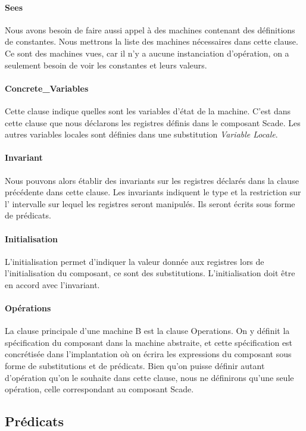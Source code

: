 \paragraph{Sees}
Nous avons besoin de faire aussi appel à des machines contenant
des définitions de constantes. Nous mettrons la liste des machines nécessaires
dans cette clause. Ce sont des machines vues, car il n'y a aucune instanciation
d'opération, on a seulement besoin de voir les constantes et leurs valeurs.

\paragraph{Concrete\_Variables}
Cette clause indique quelles sont les variables d'état de la
machine. C'est dans cette clause que nous déclarons les registres
définis dans le composant Scade. Les autres variables locales sont définies dans
une substitution \emph{Variable Locale}.

\paragraph{Invariant}
Nous pouvons alors établir des invariants sur les registres déclarés dans la
clause précédente dans cette clause. Les invariants indiquent le type et la restriction sur l'
intervalle sur lequel les registres seront manipulés. Ils seront écrits
sous forme de prédicats.

\paragraph{Initialisation}
L'initialisation permet d'indiquer la valeur donnée aux registres lors
de l'initialisation du composant, ce sont des substitutions. L'initialisation doit être en accord
avec l'invariant.

\paragraph{Opérations}
La clause principale d'une machine B est la clause Operations. On y
définit la spécification du composant dans la machine abstraite, et
cette spécification est concrétisée dans l'implantation où on écrira
les expressions du composant sous forme de substitutions et de prédicats. Bien
qu'on puisse définir autant d'opération qu'on le souhaite dans cette clause,
nous ne définirons qu'une seule opération, celle correspondant au composant Scade.


\subsection{Prédicats}

